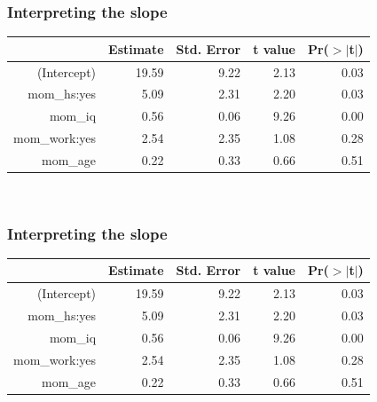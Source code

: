 
\begin{frame}
\frametitle{Interpreting the slope}


{\small
\begin{center}
\begin{tabular}{rrrrr}
  \hline
 & Estimate & Std. Error & t value & Pr($>$$|$t$|$) \\ 
  \hline
(Intercept) & 19.59 & 9.22 & 2.13 & 0.03 \\ 
  mom\_hs:yes & 5.09 & 2.31 & 2.20 & 0.03 \\ 
  mom\_iq & 0.56 & 0.06 & 9.26 & 0.00 \\ 
  mom\_work:yes & 2.54 & 2.35 & 1.08 & 0.28 \\ 
  mom\_age & 0.22 & 0.33 & 0.66 & 0.51 \\ 
   \hline
\end{tabular}
\end{center}
}

$\:$ \\


\end{frame}


\begin{frame}
\frametitle{Interpreting the slope}


{\small
\begin{center}
\begin{tabular}{rrrrr}
  \hline
 & Estimate & Std. Error & t value & Pr($>$$|$t$|$) \\ 
  \hline
(Intercept) & 19.59 & 9.22 & 2.13 & 0.03 \\ 
  mom\_hs:yes & 5.09 & 2.31 & 2.20 & 0.03 \\ 
  mom\_iq & 0.56 & 0.06 & 9.26 & 0.00 \\ 
  mom\_work:yes & 2.54 & 2.35 & 1.08 & 0.28 \\ 
  mom\_age & 0.22 & 0.33 & 0.66 & 0.51 \\ 
   \hline
\end{tabular}
\end{center}
}

$\:$ \\


\end{frame}

